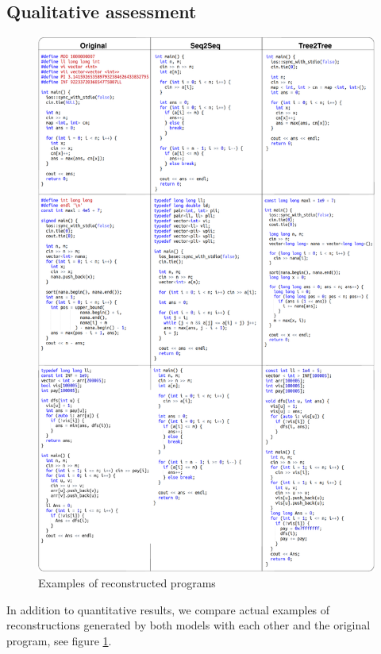 \newpage
\subsection{Qualitative assessment}
\label{sec:tree2tree-results-qual}

\begin{figure}
  \centering
  \includegraphics[width=\textwidth,height=0.9\textheight,keepaspectratio]{images/reconstruction_examples2.pdf}
  \caption{Examples of reconstructed programs}
  \label{fig:rec_examples}
\end{figure}

In addition to quantitative results, we compare actual examples of reconstructions generated by both models with each other and the original program, see figure \ref{fig:rec_examples}. 

